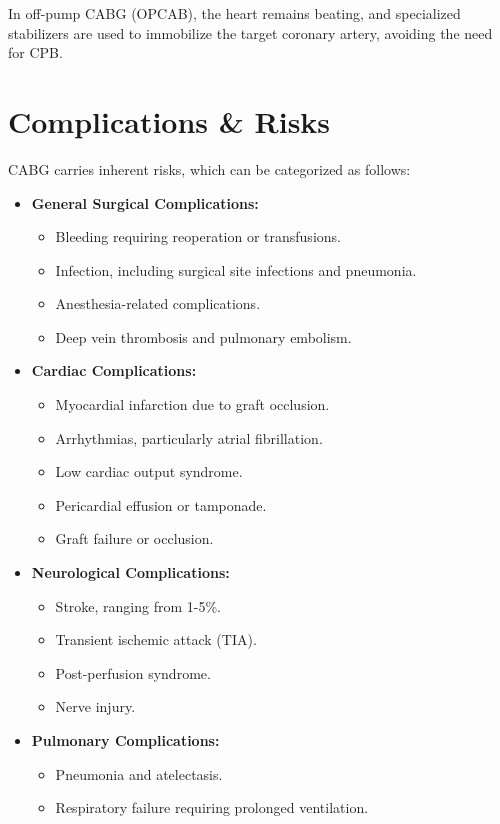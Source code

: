 In off-pump CABG (OPCAB), the heart remains beating, and specialized stabilizers are used to immobilize the target coronary artery, avoiding the need for CPB.

\section*{Complications \& Risks}
CABG carries inherent risks, which can be categorized as follows:

\begin{itemize}
  \item \textbf{General Surgical Complications:}
    \begin{itemize}
      \item Bleeding requiring reoperation or transfusions.
      \item Infection, including surgical site infections and pneumonia.
      \item Anesthesia-related complications.
      \item Deep vein thrombosis and pulmonary embolism.
    \end{itemize}
  
  \item \textbf{Cardiac Complications:}
    \begin{itemize}
      \item Myocardial infarction due to graft occlusion.
      \item Arrhythmias, particularly atrial fibrillation.
      \item Low cardiac output syndrome.
      \item Pericardial effusion or tamponade.
      \item Graft failure or occlusion.
    \end{itemize}

  \item \textbf{Neurological Complications:}
    \begin{itemize}
      \item Stroke, ranging from 1-5\%.
      \item Transient ischemic attack (TIA).
      \item Post-perfusion syndrome.
      \item Nerve injury.
    \end{itemize}

  \item \textbf{Pulmonary Complications:}
    \begin{itemize}
      \item Pneumonia and atelectasis.
      \item Respiratory failure requiring prolonged ventilation.
    \end{itemize}


\end{itemize}
